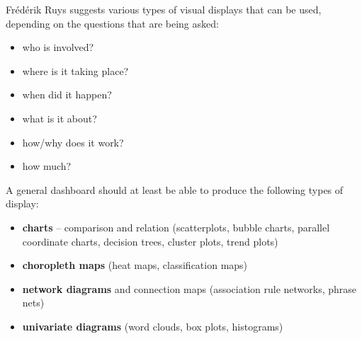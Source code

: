  Fr\'ed\'erik Ruys suggests various types of visual displays that can be used, depending on the questions that are being asked: \\ \bigskip  
\begin{minipage}{\textwidth}
\begin{multicols}{2}
\begin{itemize}[noitemsep]
\item who is involved?
\item where is it taking place? 
\item when did it happen? 
\item what is it about? 
\item how/why does it work? 
\item how much? 
\end{itemize}\end{multicols}\end{minipage}\newl
A general dashboard should at least be able to produce the following types of display: 
\begin{itemize}[noitemsep,topsep=0pt]
\item \textbf{charts} -- comparison and relation (scatterplots, bubble charts, parallel coordinate charts, decision trees, cluster plots, trend plots) 
\item \textbf{choropleth maps} (heat maps, classification maps)  
\item \textbf{network diagrams} and connection maps (association rule networks, phrase nets)
\item \textbf{univariate diagrams} (word clouds, box plots, histograms) 
\end{itemize}  
